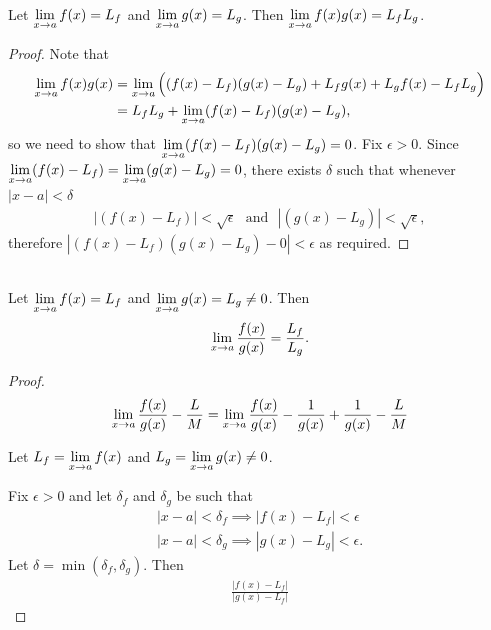 \begin{theorem*}\label{limit-of-product}~\\
  Let $\lim\limits_{x \to a} f(x) = L_f$ and $\lim\limits_{x \to a} g(x) = L_g$. Then
  $\lim\limits_{x \to a} f(x)g(x) = L_fL_g$.
\end{theorem*}

\begin{proof}
  Note that
  \begin{align*}
    \lim\limits_{x \to a} f(x)g(x) &= \lim\limits_{x \to a} \Big((f(x) - L_f)(g(x) - L_g) + L_fg(x) + L_gf(x) - L_fL_g\Big)\\
                    &= L_fL_g + \lim\limits_{x \to a} (f(x) - L_f)(g(x) - L_g),
  \end{align*}
  so we need to show that $\lim\limits_{x \to a} (f(x) - L_f)(g(x) - L_g) = 0$. Fix $\epsilon > 0$. Since
  $\lim\limits_{x \to a} (f(x) - L_f) = \lim\limits_{x \to a} (g(x) - L_g) = 0$, there exists $\delta$ such that whenever
  $|x - a| < \delta$
  \begin{align*}
    |(f(x) - L_f)| < \sqrt \epsilon ~~~\text{and}~~~|(g(x) - L_g)| < \sqrt \epsilon,
  \end{align*}
  therefore $|(f(x) - L_f)(g(x) - L_g) - 0| < \epsilon$ as required.
\end{proof}

\begin{theorem*}~\\
  Let $\lim\limits_{x \to a} f(x) = L_f$ and $\lim\limits_{x \to a} g(x) = L_g \neq 0$. Then
  \begin{align*}
    \lim\limits_{x \to a} \frac{f(x)}{g(x)} = \frac{L_f}{L_g}.
  \end{align*}
\end{theorem*}

\begin{proof}
  \begin{align*}
    \lim\limits_{x \to a} \frac{f(x)}{g(x)} - \frac{L}{M}
    = \lim\limits_{x \to a} \frac{f(x)}{g(x)} - \frac{1}{g(x)} + \frac{1}{g(x)} - \frac{L}{M}
  \end{align*}

  Let $L_f = \lim\limits_{x \to a} f(x)$ and $L_g = \lim\limits_{x \to a} g(x) \neq 0$.

  Fix $\epsilon > 0$ and let $\delta_f$ and $\delta_g$ be such that
  \begin{align*}
    |x - a| < \delta_f \implies |f(x) - L_f| < \epsilon\\
    |x - a| < \delta_g \implies |g(x) - L_g| < \epsilon.
  \end{align*}
  Let $\delta = \min(\delta_f, \delta_g)$. Then
  \begin{align*}
    \frac{|f(x) - L_f|}{|g(x) - L_f|}
  \end{align*}
\end{proof}


